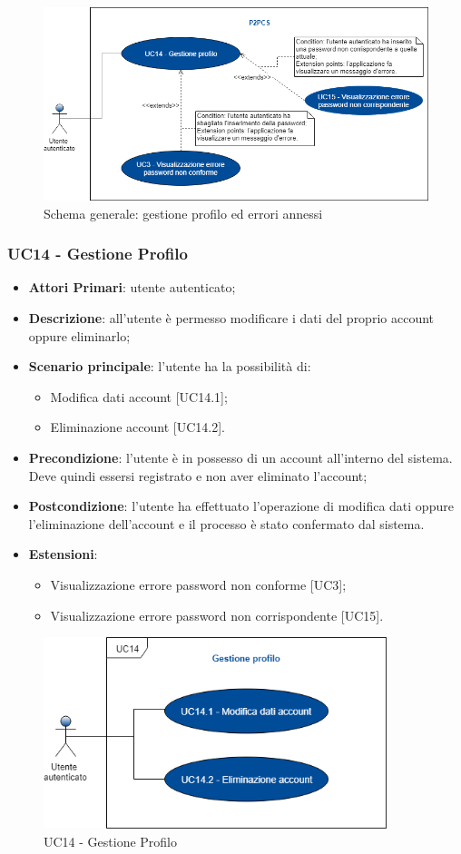 \begin{figure}[h]
	\includegraphics[width=15cm]{res/images/Schemagenerale5.png}
	\centering
	\caption{Schema generale: gestione profilo ed errori annessi}
\end{figure}
\subsubsection{UC14 - Gestione Profilo}
\begin{itemize}
	\item \textbf{Attori Primari}: utente autenticato;
	\item \textbf{Descrizione}: all'utente è permesso modificare i dati del proprio account oppure eliminarlo;
	\item \textbf{Scenario principale}: l'utente ha la possibilità di: 
	\begin{itemize}
		\item Modifica dati account [UC14.1];
		\item Eliminazione account [UC14.2].
	\end{itemize}
	\item \textbf{Precondizione}: l'utente è in possesso di un account all'interno del sistema. Deve quindi essersi registrato e non aver eliminato l'account;
	\item \textbf{Postcondizione}: l'utente ha effettuato l'operazione di modifica dati oppure l'eliminazione dell'account e il processo è stato confermato dal sistema.
	\item \textbf{Estensioni}:
	\begin{itemize}
		\item Visualizzazione errore password non conforme [UC3];
		\item Visualizzazione errore password non corrispondente [UC15].
	\end{itemize}
\end{itemize}
\begin{figure}[h]
	\includegraphics[width=10cm]{res/images/UC14Profilo.png}
	\centering
	\caption{UC14 - Gestione Profilo}
\end{figure} 
